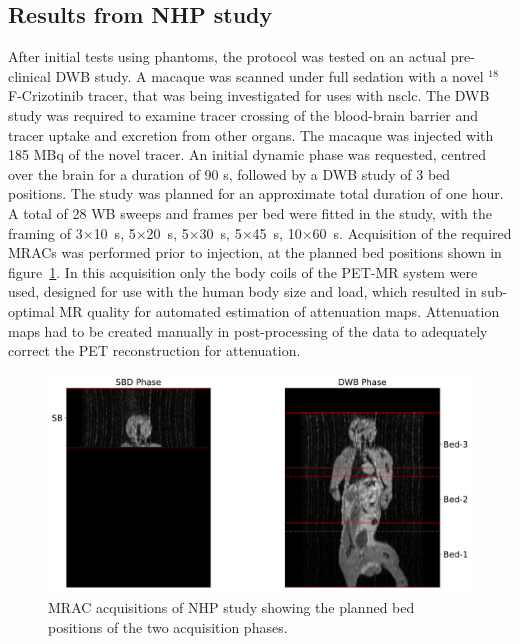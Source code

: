 \subsection{Results from NHP study}
After initial tests using phantoms, the protocol was tested on an actual pre-clinical DWB study. A macaque was scanned under full sedation with a novel $^{18}$F-Crizotinib tracer, that was being investigated for uses with \gls{nsclc}. The DWB study was required to examine tracer crossing of the blood-brain barrier and tracer uptake and excretion from other organs. The macaque was injected with 185 \si{\mega \becquerel} of the novel tracer. An initial dynamic phase was requested, centred over the brain for a duration of 90 s, followed by a DWB study of 3 bed positions. The study was planned for an approximate total duration of one hour. A total of 28 WB sweeps and frames per bed were fitted in the study, with the framing of 3$\times$10~\si{\s}, 5$\times$20~\si{\s}, 5$\times$30~\si{\s}, 5$\times$45~\si{\s}, 10$\times$60~\si{\s}. 
Acquisition of the required MRACs was performed prior to injection, at the planned bed positions shown in figure~\ref{fig3_1:Macaque_MRI}. In this acquisition only the body coils of the PET-MR system were used, designed for use with the human body size and load, which resulted in sub-optimal MR quality for automated estimation of attenuation maps. Attenuation maps had to be created manually in post-processing of the data to adequately correct the PET reconstruction for attenuation.  

\begin{figure} [ht!]
\centering
\includegraphics[scale=0.5,angle=0]{3_Results/3_1_DWB_Optimization/figures/3_1_Macaque_MRI.pdf}
\caption{MRAC acquisitions of NHP study showing the planned bed positions of the two acquisition phases.}
\label{fig3_1:Macaque_MRI}
\end{figure}

